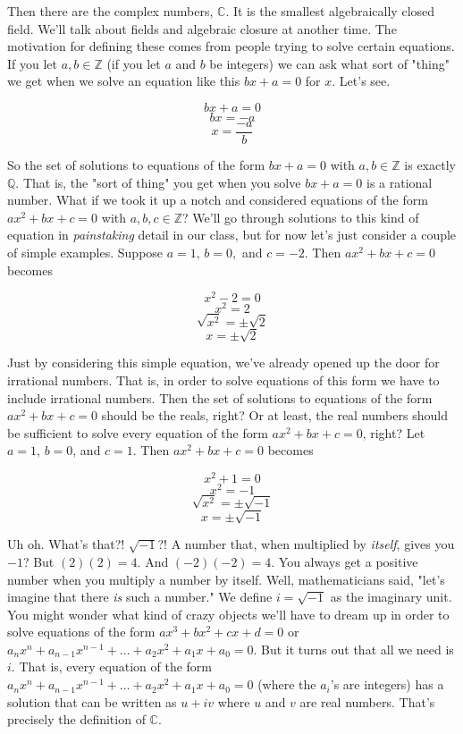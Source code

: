 \documentclass[11pt,letterpaper]{article}
\begin{document}
\noindent Then there are the complex numbers, $\mathbb{C}$. It is the smallest algebraically closed field. We'll talk about fields and algebraic closure at another time. The motivation for defining these comes from people trying to solve certain equations. If you let $a,b \in \mathbb{Z}$ (if you let $a$ and $b$ be integers) we can ask what sort of "thing" we get when we solve an equation like this $bx + a = 0$ for $x$. Let's see.

\newpage

$$ bx + a = 0 $$ 
$$ bx = -a$$
$$ x = \frac{-a}{b}$$

\noindent So the set of solutions to equations of the form $bx+a=0$ with $a,b \in \mathbb{Z}$ is exactly $\mathbb{Q}$. That is, the "sort of thing" you get when you solve $bx+a=0$ is a rational number. What if we took it up a notch and considered equations of the form $ax^2 +bx + c = 0$ with $a,b,c \in \mathbb{Z}$? We'll go through solutions to this kind of equation in \textit{painstaking} detail in our class, but for now let's just consider a couple of simple examples. Suppose $a = 1, \, b = 0,$ and $c = -2$. Then $ax^2 +bx + c = 0$ becomes

$$ x^2 - 2 = 0 $$
$$ x^2 = 2 $$
$$ \sqrt{x^2} = \pm \sqrt{2} $$
$$ x = \pm \sqrt{2} $$

\noindent Just by considering this simple equation, we've already opened up the door for irrational numbers. That is, in order to solve equations of this form we have to include irrational numbers. Then the set of solutions to equations of the form  $ax^2 +bx + c = 0$ should be the reals, right? Or at least, the real numbers should be sufficient to solve every equation of the form $ax^2 +bx + c = 0$, right? Let $a = 1, \, b = 0$, and $c = 1$. Then $ax^2 +bx + c = 0$ becomes

$$ x^2 + 1 = 0 $$
$$ x^2 = -1$$
$$ \sqrt{x^2} = \pm \sqrt{-1}$$
$$ x = \pm \sqrt{-1}$$

\noindent Uh oh. What's that?! $\sqrt{-1}$?! A number that, when multiplied by \textit{itself}, gives you $-1$? But $ (2)(2) = 4$. And $(-2)(-2) = 4$. You always get a positive number when you multiply a number by itself. Well, mathematicians said, "let's imagine that there \textit{is} such a number." We define $i = \sqrt{-1}$ as the imaginary unit. \\

\noindent You might wonder what kind of crazy objects we'll have to dream up in order to solve equations of the form $ax^3 + bx^2 + cx + d = 0$ or $a_nx^n + a_{n-1}x^{n-1} + \dots + a_2x^2 + a_1x + a_0 = 0$. But it turns out that all we need is $i$. That is, every equation of the form $a_nx^n + a_{n-1}x^{n-1} + \dots + a_2x^2 + a_1x + a_0 = 0$ (where the $a_i$'s are integers) has a solution that can be written as $u+iv$ where $u$ and $v$ are real numbers. That's precisely the definition of $\mathbb{C}$. \\
\end{document}

